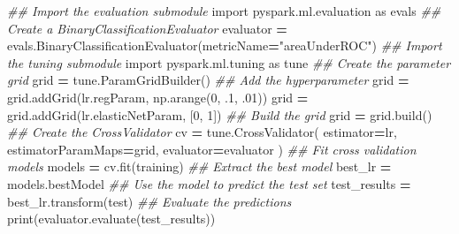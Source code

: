 \documentclass[]{book}
\newenvironment{Shaded}{\begin{snugshade}}{\end{snugshade}}
\newcommand{\DecValTok}[1]{\textcolor[rgb]{0.00,0.00,0.81}{#1}}
\newcommand{\StringTok}[1]{\textcolor[rgb]{0.31,0.60,0.02}{#1}}
\newcommand{\ImportTok}[1]{#1}
\newcommand{\CommentTok}[1]{\textcolor[rgb]{0.56,0.35,0.01}{\textit{#1}}}
\newcommand{\OperatorTok}[1]{\textcolor[rgb]{0.81,0.36,0.00}{\textbf{#1}}}
\newcommand{\BuiltInTok}[1]{#1}
\newcommand{\NormalTok}[1]{#1}
\begin{document}
\begin{Shaded}
\begin{Highlighting}[]
\CommentTok{## Import the evaluation submodule}
\ImportTok{import}\NormalTok{ pyspark.ml.evaluation }\ImportTok{as}\NormalTok{ evals}
\CommentTok{## Create a BinaryClassificationEvaluator}
\NormalTok{evaluator }\OperatorTok{=}\NormalTok{ evals.BinaryClassificationEvaluator(metricName}\OperatorTok{=}\StringTok{"areaUnderROC"}\NormalTok{)}
\CommentTok{## Import the tuning submodule}
\ImportTok{import}\NormalTok{ pyspark.ml.tuning }\ImportTok{as}\NormalTok{ tune}
\CommentTok{## Create the parameter grid}
\NormalTok{grid }\OperatorTok{=}\NormalTok{ tune.ParamGridBuilder()}
\CommentTok{## Add the hyperparameter}
\NormalTok{grid }\OperatorTok{=}\NormalTok{ grid.addGrid(lr.regParam, np.arange(}\DecValTok{0}\NormalTok{, .}\DecValTok{1}\NormalTok{, .}\DecValTok{01}\NormalTok{))}
\NormalTok{grid }\OperatorTok{=}\NormalTok{ grid.addGrid(lr.elasticNetParam, [}\DecValTok{0}\NormalTok{, }\DecValTok{1}\NormalTok{])}
\CommentTok{## Build the grid}
\NormalTok{grid }\OperatorTok{=}\NormalTok{ grid.build()}
\CommentTok{## Create the CrossValidator}
\NormalTok{cv }\OperatorTok{=}\NormalTok{ tune.CrossValidator(}
\NormalTok{estimator}\OperatorTok{=}\NormalTok{lr,}
\NormalTok{estimatorParamMaps}\OperatorTok{=}\NormalTok{grid,}
\NormalTok{evaluator}\OperatorTok{=}\NormalTok{evaluator}
\NormalTok{               )}
\CommentTok{## Fit cross validation models}
\NormalTok{models }\OperatorTok{=}\NormalTok{ cv.fit(training)}
\CommentTok{## Extract the best model}
\NormalTok{best_lr }\OperatorTok{=}\NormalTok{ models.bestModel}
\CommentTok{## Use the model to predict the test set}
\NormalTok{test_results }\OperatorTok{=}\NormalTok{ best_lr.transform(test)}
\CommentTok{## Evaluate the predictions}
\BuiltInTok{print}\NormalTok{(evaluator.evaluate(test_results))}
\end{Highlighting}
\end{Shaded}
\end{document}
